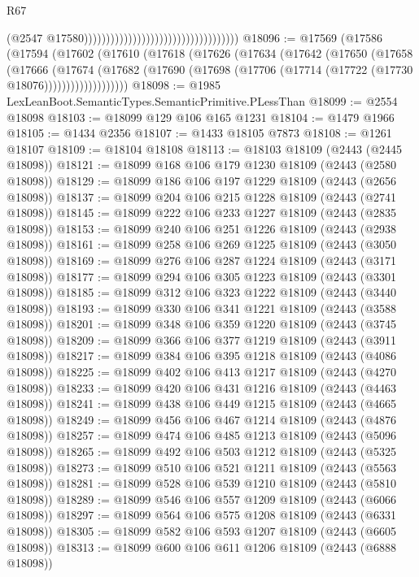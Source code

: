 \begin{lexlean}{R67}
\begin{coremodule}
                                                                        (@2547
                                                                          @17580)))))))))))))))))))))))))))))))))))
@18096 := @17569
    (@17586
      (@17594
        (@17602
          (@17610
            (@17618
              (@17626
                (@17634
                  (@17642
                    (@17650
                      (@17658
                        (@17666
                          (@17674
                            (@17682
                              (@17690
                                (@17698 (@17706 (@17714 (@17722 (@17730 @18076)))))))))))))))))))
@18098 := @1985 LexLeanBoot.SemanticTypes.SemanticPrimitive.PLessThan
@18099 := @2554 @18098
@18103 := @18099 @129 @106 @165 @1231
@18104 := @1479 @1966
@18105 := @1434 @2356
@18107 := @1433 @18105 @7873
@18108 := @1261 @18107
@18109 := @18104 @18108
@18113 := @18103 @18109 (@2443 (@2445 @18098))
@18121 := @18099 @168 @106 @179 @1230 @18109 (@2443 (@2580 @18098))
@18129 := @18099 @186 @106 @197 @1229 @18109 (@2443 (@2656 @18098))
@18137 := @18099 @204 @106 @215 @1228 @18109 (@2443 (@2741 @18098))
@18145 := @18099 @222 @106 @233 @1227 @18109 (@2443 (@2835 @18098))
@18153 := @18099 @240 @106 @251 @1226 @18109 (@2443 (@2938 @18098))
@18161 := @18099 @258 @106 @269 @1225 @18109 (@2443 (@3050 @18098))
@18169 := @18099 @276 @106 @287 @1224 @18109 (@2443 (@3171 @18098))
@18177 := @18099 @294 @106 @305 @1223 @18109 (@2443 (@3301 @18098))
@18185 := @18099 @312 @106 @323 @1222 @18109 (@2443 (@3440 @18098))
@18193 := @18099 @330 @106 @341 @1221 @18109 (@2443 (@3588 @18098))
@18201 := @18099 @348 @106 @359 @1220 @18109 (@2443 (@3745 @18098))
@18209 := @18099 @366 @106 @377 @1219 @18109 (@2443 (@3911 @18098))
@18217 := @18099 @384 @106 @395 @1218 @18109 (@2443 (@4086 @18098))
@18225 := @18099 @402 @106 @413 @1217 @18109 (@2443 (@4270 @18098))
@18233 := @18099 @420 @106 @431 @1216 @18109 (@2443 (@4463 @18098))
@18241 := @18099 @438 @106 @449 @1215 @18109 (@2443 (@4665 @18098))
@18249 := @18099 @456 @106 @467 @1214 @18109 (@2443 (@4876 @18098))
@18257 := @18099 @474 @106 @485 @1213 @18109 (@2443 (@5096 @18098))
@18265 := @18099 @492 @106 @503 @1212 @18109 (@2443 (@5325 @18098))
@18273 := @18099 @510 @106 @521 @1211 @18109 (@2443 (@5563 @18098))
@18281 := @18099 @528 @106 @539 @1210 @18109 (@2443 (@5810 @18098))
@18289 := @18099 @546 @106 @557 @1209 @18109 (@2443 (@6066 @18098))
@18297 := @18099 @564 @106 @575 @1208 @18109 (@2443 (@6331 @18098))
@18305 := @18099 @582 @106 @593 @1207 @18109 (@2443 (@6605 @18098))
@18313 := @18099 @600 @106 @611 @1206 @18109 (@2443 (@6888 @18098))

\end{coremodule}
\end{lexlean}

